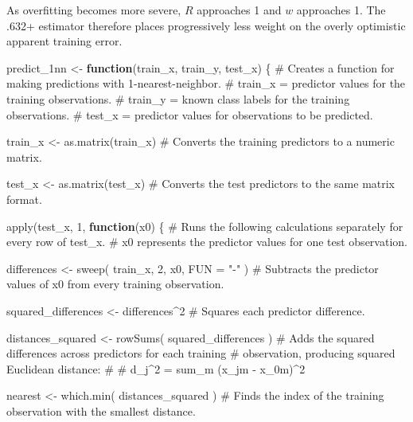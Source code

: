 \documentclass[
  letterpaper,
  DIV=11,
  numbers=noendperiod]{scrreprt}
\newenvironment{Shaded}{\begin{snugshade}}{\end{snugshade}}
\newcommand{\AttributeTok}[1]{\textcolor[rgb]{0.40,0.45,0.13}{#1}}
\newcommand{\CommentTok}[1]{\textcolor[rgb]{0.37,0.37,0.37}{#1}}
\newcommand{\ControlFlowTok}[1]{\textcolor[rgb]{0.00,0.23,0.31}{\textbf{#1}}}
\newcommand{\DecValTok}[1]{\textcolor[rgb]{0.68,0.00,0.00}{#1}}
\newcommand{\FunctionTok}[1]{\textcolor[rgb]{0.28,0.35,0.67}{#1}}
\newcommand{\NormalTok}[1]{\textcolor[rgb]{0.00,0.23,0.31}{#1}}
\newcommand{\OtherTok}[1]{\textcolor[rgb]{0.00,0.23,0.31}{#1}}
\newcommand{\SpecialCharTok}[1]{\textcolor[rgb]{0.37,0.37,0.37}{#1}}
\newcommand{\StringTok}[1]{\textcolor[rgb]{0.13,0.47,0.30}{#1}}
\begin{document}
As overfitting becomes more severe, \(R\) approaches 1 and \(w\)
approaches 1. The .632+ estimator therefore places progressively less
weight on the overly optimistic apparent training error.

\begin{Shaded}
\begin{Highlighting}[]
\NormalTok{predict\_1nn }\OtherTok{\textless{}{-}} \ControlFlowTok{function}\NormalTok{(train\_x, train\_y, test\_x) \{}
  \CommentTok{\# Creates a function for making predictions with 1{-}nearest{-}neighbor.}
  \CommentTok{\# train\_x = predictor values for the training observations.}
  \CommentTok{\# train\_y = known class labels for the training observations.}
  \CommentTok{\# test\_x  = predictor values for observations to be predicted.}

\NormalTok{  train\_x }\OtherTok{\textless{}{-}} \FunctionTok{as.matrix}\NormalTok{(train\_x)}
  \CommentTok{\# Converts the training predictors to a numeric matrix.}

\NormalTok{  test\_x }\OtherTok{\textless{}{-}} \FunctionTok{as.matrix}\NormalTok{(test\_x)}
  \CommentTok{\# Converts the test predictors to the same matrix format.}

  \FunctionTok{apply}\NormalTok{(test\_x, }\DecValTok{1}\NormalTok{, }\ControlFlowTok{function}\NormalTok{(x0) \{}
    \CommentTok{\# Runs the following calculations separately for every row of test\_x.}
    \CommentTok{\# x0 represents the predictor values for one test observation.}

\NormalTok{    differences }\OtherTok{\textless{}{-}} \FunctionTok{sweep}\NormalTok{(}
\NormalTok{      train\_x,}
      \DecValTok{2}\NormalTok{,}
\NormalTok{      x0,}
      \AttributeTok{FUN =} \StringTok{"{-}"}
\NormalTok{    )}
    \CommentTok{\# Subtracts the predictor values of x0 from every training observation.}

\NormalTok{    squared\_differences }\OtherTok{\textless{}{-}}\NormalTok{ differences}\SpecialCharTok{\^{}}\DecValTok{2}
    \CommentTok{\# Squares each predictor difference.}

\NormalTok{    distances\_squared }\OtherTok{\textless{}{-}} \FunctionTok{rowSums}\NormalTok{(}
\NormalTok{      squared\_differences}
\NormalTok{    )}
    \CommentTok{\# Adds the squared differences across predictors for each training}
    \CommentTok{\# observation, producing squared Euclidean distance:}
    \CommentTok{\#}
    \CommentTok{\# d\_j\^{}2 = sum\_m (x\_jm {-} x\_0m)\^{}2}

\NormalTok{    nearest }\OtherTok{\textless{}{-}} \FunctionTok{which.min}\NormalTok{(}
\NormalTok{      distances\_squared}
\NormalTok{    )}
    \CommentTok{\# Finds the index of the training observation with the smallest distance.}


\end{Highlighting}
\end{Shaded}
\end{document}
